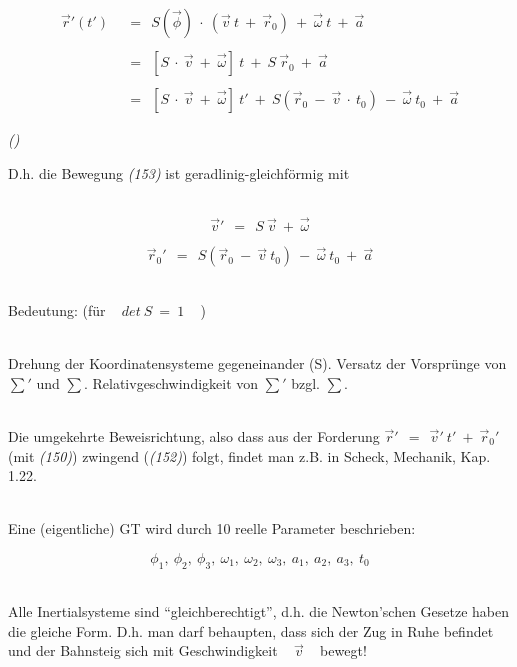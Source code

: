 \documentclass{scrreprt}
\newcounter{ec} %
\newcommand{\iec}{\addtocounter{ec}{1}\begin{flushright}\textit{(\arabic{ec})}\end{flushright}}
\begin{document}
\begin{flushleft}
	\begin{align*}
	\vec{r}'(t') ~~ &= ~~ S(\vec{\phi}) ~ \cdot ~ \left( \vec{v} ~ t ~ + ~ \vec{r}_0 \right) ~ + ~ \vec{\omega} ~ t ~ + ~ \vec{a} \\ \\
	&= ~~ \left[ S ~ \cdot ~ \vec{v} ~ + ~ \vec{\omega} \right] ~ t ~ + ~ S ~ \vec{r}_0 ~ + ~ \vec{a} \\ \\
	&= ~~ \left[ S ~ \cdot ~ \vec{v} ~ + ~ \vec{\omega} \right] ~ t' ~ + ~ S \left( \vec{r}_0 ~ - ~ \vec{v} ~ \cdot ~ t_0 \right) ~ - ~ \vec{\omega} ~ t_0 ~ + ~ \vec{a}
	\end{align*}
	
	\iec
	
	D.h. die Bewegung \textit{(153)} ist geradlinig-gleichförmig mit
	
	~\\
	
	\[ \vec{v}' ~~ = ~~ S ~ \vec{v} ~ + ~ \vec{\omega} \]
	
	\[ \vec{r}_0' ~~ = ~~ S \left( \vec{r}_0 ~ - ~ \vec{v} ~ t_0 \right) ~ - ~ \vec{\omega} ~ t_0 ~ + ~ \vec{a} \]
	
	~\\
	
	Bedeutung: (für ~ $det ~ S ~ = ~ 1$ ~ )
	
	~\\
	
	Drehung der Koordinatensysteme gegeneinander (S). Versatz der Vorsprünge von $\sum'$ und $\sum$. Relativgeschwindigkeit von $\sum'$ bzgl. $\sum$.
	
	~\\
	
	Die umgekehrte Beweisrichtung, also dass aus der Forderung $\vec{r}' ~~ = ~~ \vec{v}' ~ t' ~ + ~ \vec{r}_0'$ (mit \textit{(150)}) zwingend (\textit{(152)}) folgt, findet man z.B. in Scheck, Mechanik, Kap. 1.22.
	
	~\\
	
	Eine (eigentliche) GT wird durch 10 reelle Parameter beschrieben:
	
	\[ \phi_1, ~ \phi_2, ~ \phi_3, ~ \omega_1, ~ \omega_2, ~ \omega_3, ~ a_1, ~ a_2, ~ a_3, ~ t_0 \]
	
	~\\
	
	Alle Inertialsysteme sind \textquotedblleft gleichberechtigt\textquotedblright, d.h. die Newton'schen Gesetze haben die gleiche Form. D.h. man darf behaupten, dass sich der Zug in Ruhe befindet und der Bahnsteig sich mit Geschwindigkeit ~ $\vec{v}$ ~ bewegt!
	
	~\\
	
	
	
	
	
	
	
	
	
	
	
	
	
	
\end{flushleft}
	
\end{document}
